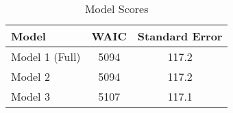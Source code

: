 \begin{table}[h!]
\centering
\begin{tabular}{|l|c|c|}
\hline
\rowcolor[HTML]{E7EAF6} 
\textbf{Model} & \textbf{WAIC} & \textbf{Standard Error} \\ \hline
Model 1 (Full) & 5094 & 117.2 \\ \hline
Model 2 & 5094 & 117.2  \\ \hline
Model 3 & 5107 & 117.1  \\ \hline
\end{tabular}
\caption{Model Scores}
\end{table}
